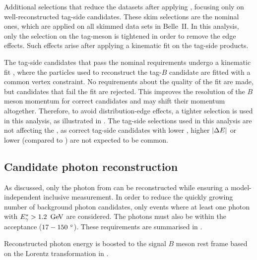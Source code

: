 \begin{table}[htbp!]
    \centering
     \caption{\label{tab:fei_skim_cuts} 
     Additional selections that reduce the datasets after applying \FEI, focusing only on well-reconstructed tag-side candidates.
     These \FEI skim selections are the nominal ones, which are applied on all \FEI skimmed data sets in Belle~II.
     In this analysis, only the selection on the tag-\B meson is tightened in order to remove the edge effects.
     Such effects arise after applying a kinematic fit on the tag-side products.
     }
     \resizebox{0.75\textwidth}{!}{
        
     }
\end{table}

The tag-side candidates that pass the nominal \FEI requirements undergo a kinematic fit \cite{Belle-IIanalysissoftwareGroup:2019dlq}, 
where the particles used to reconstruct the tag-$B$ candidate are fitted with a common vertex constraint.
No requirements about the quality of the fit are made, but candidates that fail the fit are rejected.
This improves the resolution of the $B$ meson momentum for correct candidates and may shift their momentum altogether.
Therefore, to avoid distribution-edge effects, a tighter \Mbc selection is used in this analysis, as illustrated in .
The tag-side selections used in this analysis are not affecting the \BtoXsgamma, 
as correct tag-side candidates with 
lower \Mbc, 
higher $|{\Delta E}|$ 
or lower \feiProb (compared to ) are not expected to be common.


\subsection{Candidate photon reconstruction}\label{sec:gamma_reconstruction}

As discussed, only the photon from \BtoXsgamma can be reconstructed while ensuring a model-independent inclusive measurement.
In order to reduce the quickly growing number of background photon candidates, only events where at least one photon with ${E^*_{\gamma}}>1.2~\mathrm{\,Ge\kern -0.1em V}$ are considered.
The photons must also be within the \CDC acceptance ($17-150~^{\circ}$).
These requirements are summarised in .
\begin{table}[htbp!]
    \centering
     \caption{\label{tab:photon_requirements} Requirements for photons in reconstructed events.}
\end{table}
Reconstructed photon energy is boosted to the signal $B$ meson rest frame based on the Lorentz transformation in .

